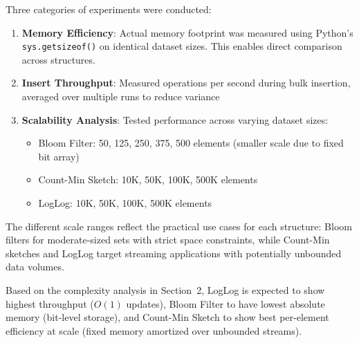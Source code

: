 Three categories of experiments were conducted:

\begin{enumerate}
    \item \textbf{Memory Efficiency}: Actual memory footprint was measured using Python's \texttt{sys.getsizeof()} on identical dataset sizes. This enables direct comparison across structures.

    \item \textbf{Insert Throughput}: Measured operations per second during bulk insertion, averaged over multiple runs to reduce variance

    \item \textbf{Scalability Analysis}: Tested performance across varying dataset sizes:
    \begin{itemize}
        \item Bloom Filter: 50, 125, 250, 375, 500 elements (smaller scale due to fixed bit array)
        \item Count-Min Sketch: 10K, 50K, 100K, 500K elements
        \item LogLog: 10K, 50K, 100K, 500K elements
    \end{itemize}
\end{enumerate}

The different scale ranges reflect the practical use cases for each structure: Bloom filters for moderate-sized sets with strict space constraints, while Count-Min sketches and LogLog target streaming applications with potentially unbounded data volumes.

Based on the complexity analysis in Section~2, LogLog is expected to show highest throughput ($O(1)$ updates), Bloom Filter to have lowest absolute memory (bit-level storage), and Count-Min Sketch to show best per-element efficiency at scale (fixed memory amortized over unbounded streams).